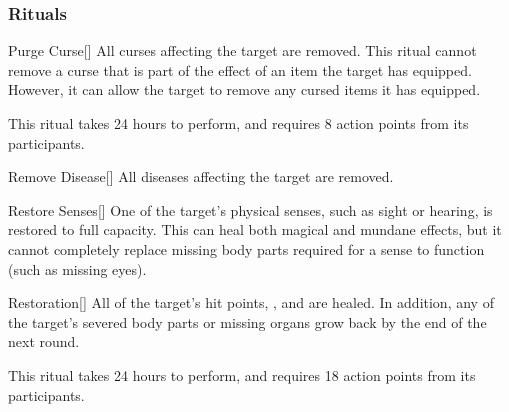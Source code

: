 \subsubsection{Rituals}


\lowercase{\hypertarget{spell:Purge Curse}{}}\label{spell:Purge Curse}
\begin{apability}[Rank 3]{\hypertarget{spell:Purge Curse}{Purge Curse}}[]
All curses affecting the target are removed.
This ritual cannot remove a curse that is part of the effect of an item the target has equipped.
However, it can allow the target to remove any cursed items it has equipped.

This ritual takes 24 hours to perform, and requires 8 action points from its participants.
\end{apability}
\vspace{0.25em}



\lowercase{\hypertarget{spell:Remove Disease}{}}\label{spell:Remove Disease}
\begin{apability}[Rank 3]{\hypertarget{spell:Remove Disease}{Remove Disease}}[]
All diseases affecting the target are removed.
\end{apability}
\vspace{0.25em}



\lowercase{\hypertarget{spell:Restore Senses}{}}\label{spell:Restore Senses}
\begin{apability}[Rank 3]{\hypertarget{spell:Restore Senses}{Restore Senses}}[]
One of the target's physical senses, such as sight or hearing, is restored to full capacity.
This can heal both magical and mundane effects, but it cannot completely replace missing body parts required for a sense to function (such as missing eyes).
\end{apability}
\vspace{0.25em}



\lowercase{\hypertarget{spell:Restoration}{}}\label{spell:Restoration}
\begin{apability}[Rank 4]{\hypertarget{spell:Restoration}{Restoration}}[]
All of the target's hit points, , and  are healed.
In addition, any of the target's severed body parts or missing organs grow back by the end of the next round.

This ritual takes 24 hours to perform, and requires 18 action points from its participants.
\end{apability}
\vspace{0.25em}



